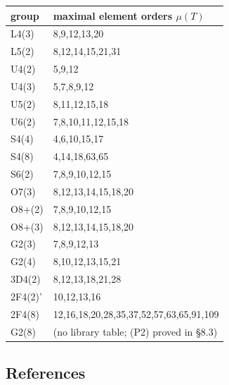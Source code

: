 \documentclass[11pt,a4paper]{article}
\begin{document}
\begin{center}\small\begin{tabular}{ll}\toprule
group & maximal element orders \(\mu(T)\) \\
\midrule
L4(3) & 8,9,12,13,20 \\
L5(2) & 8,12,14,15,21,31 \\
U4(2) & 5,9,12 \\
U4(3) & 5,7,8,9,12 \\
U5(2) & 8,11,12,15,18 \\
U6(2) & 7,8,10,11,12,15,18 \\
S4(4) & 4,6,10,15,17 \\
S4(8) & 4,14,18,63,65 \\
S6(2) & 7,8,9,10,12,15 \\
O7(3) & 8,12,13,14,15,18,20 \\
O8+(2) & 7,8,9,10,12,15 \\
O8+(3) & 8,12,13,14,15,18,20 \\
G2(3) & 7,8,9,12,13 \\
G2(4) & 8,10,12,13,15,21 \\
3D4(2) & 8,12,13,18,21,28 \\
2F4(2)' & 10,12,13,16 \\
2F4(8) & 12,16,18,20,28,35,37,52,57,63,65,91,109 \\
G2(8) & (no library table; (P2) proved in §8.3) \\
\bottomrule\end{tabular}\end{center}

\subsection{References}\label{references}
\end{document}
